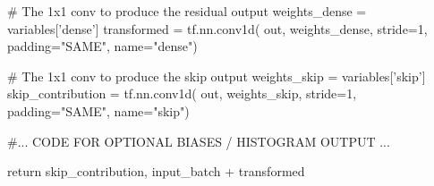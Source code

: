 \documentclass[8pt]{beamer}
\begin{document}
\begin{frame}[fragile]
\begin{columns}
\begin{column}{0.5\textwidth}
\begin{verbnobox}[\tiny]
        # The 1x1 conv to produce the residual output
        weights_dense = variables['dense']
        transformed = tf.nn.conv1d(
            out, weights_dense, stride=1, padding="SAME", name="dense")

        # The 1x1 conv to produce the skip output
        weights_skip = variables['skip']
        skip_contribution = tf.nn.conv1d(
            out, weights_skip, stride=1, padding="SAME", name="skip")

            #... CODE FOR OPTIONAL BIASES / HISTOGRAM OUTPUT ...
        
        return skip_contribution, input_batch + transformed
 \end{verbnobox}

\end{column}
\end{columns} 
 
\end{frame}
\end{document}
